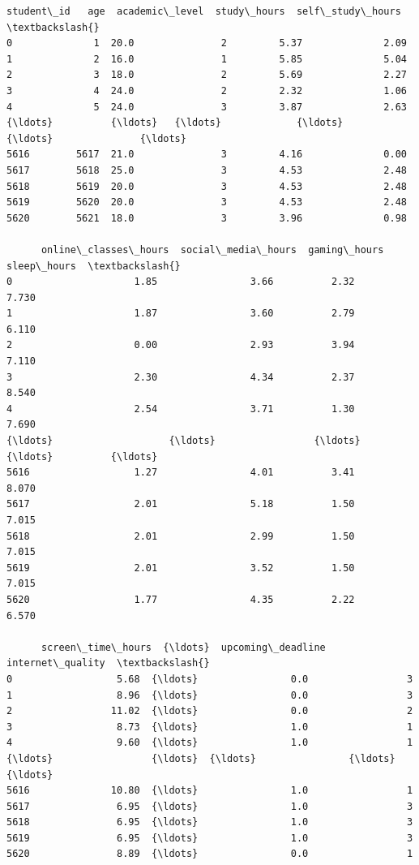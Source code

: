 \documentclass[11pt]{article}
\makeatletter
\newcommand{\boxspacing}{\kern\kvtcb@left@rule\kern\kvtcb@boxsep}
\newcommand{\prompt}[4]{
        {\ttfamily\llap{{\color{#2}[#3]:\hspace{3pt}#4}}\vspace{-\baselineskip}}
    }
\makeatother
\begin{document}
            \begin{tcolorbox}[breakable, size=fbox, boxrule=.5pt, pad at break*=1mm, opacityfill=0]
\prompt{Out}{outcolor}{18}{\boxspacing}
\begin{Verbatim}[commandchars=\\\{\}]
      student\_id   age  academic\_level  study\_hours  self\_study\_hours  \textbackslash{}
0              1  20.0               2         5.37              2.09
1              2  16.0               1         5.85              5.04
2              3  18.0               2         5.69              2.27
3              4  24.0               2         2.32              1.06
4              5  24.0               3         3.87              2.63
{\ldots}          {\ldots}   {\ldots}             {\ldots}          {\ldots}               {\ldots}
5616        5617  21.0               3         4.16              0.00
5617        5618  25.0               3         4.53              2.48
5618        5619  20.0               3         4.53              2.48
5619        5620  20.0               3         4.53              2.48
5620        5621  18.0               3         3.96              0.98

      online\_classes\_hours  social\_media\_hours  gaming\_hours  sleep\_hours  \textbackslash{}
0                     1.85                3.66          2.32        7.730
1                     1.87                3.60          2.79        6.110
2                     0.00                2.93          3.94        7.110
3                     2.30                4.34          2.37        8.540
4                     2.54                3.71          1.30        7.690
{\ldots}                    {\ldots}                 {\ldots}           {\ldots}          {\ldots}
5616                  1.27                4.01          3.41        8.070
5617                  2.01                5.18          1.50        7.015
5618                  2.01                2.99          1.50        7.015
5619                  2.01                3.52          1.50        7.015
5620                  1.77                4.35          2.22        6.570

      screen\_time\_hours  {\ldots}  upcoming\_deadline  internet\_quality  \textbackslash{}
0                  5.68  {\ldots}                0.0                 3
1                  8.96  {\ldots}                0.0                 3
2                 11.02  {\ldots}                0.0                 2
3                  8.73  {\ldots}                1.0                 1
4                  9.60  {\ldots}                1.0                 1
{\ldots}                 {\ldots}  {\ldots}                {\ldots}               {\ldots}
5616              10.80  {\ldots}                1.0                 1
5617               6.95  {\ldots}                1.0                 3
5618               6.95  {\ldots}                1.0                 3
5619               6.95  {\ldots}                1.0                 3
5620               8.89  {\ldots}                0.0                 1


\end{Verbatim}
\end{tcolorbox}
\end{document}

